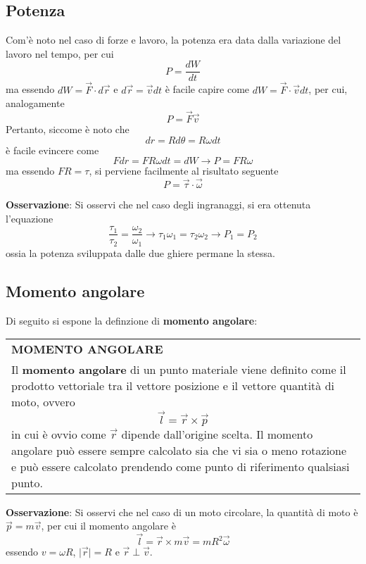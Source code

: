 \documentclass[a4paper]{extarticle}
\renewcommand\arraystretch{}
\begin{document}
\vspace{1em}
\subsection{Potenza}
Com'è noto nel caso di forze e lavoro, la potenza era data dalla variazione del lavoro nel tempo, per cui
\[\boxed{P=\frac{dW}{dt}}\]
ma essendo $dW=\vec F \cdot d \vec r$ e $d \vec r = \vec v dt$ è facile capire come $dW=\vec F \cdot \vec v dt$, per cui, analogamente
\[\boxed{P=\vec F \vec v}\]
Pertanto, siccome è noto che
\[dr = R d\theta = R \omega dt\]
è facile evincere come
\[F dr = F R \omega dt = dW \longrightarrow P=FR \omega\]
ma essendo $FR=\tau$, si perviene facilmente al risultato seguente
\[\boxed{P=\vec \tau \cdot \vec \omega}\]

\vspace{1em}
\noindent
\textbf{Osservazione}: Si osservi che nel caso degli ingranaggi, si era ottenuta l'equazione
\[\frac{\tau_1}{\tau_2} = \frac{\omega_2}{\omega_1} \longrightarrow \tau_1 \omega_1 = \tau_2 \omega_2 \longrightarrow P_1 = P_2\]
ossia la potenza sviluppata dalle due ghiere permane la stessa.

\vspace{1em}
\subsection{Momento angolare}
Di seguito si espone la definzione di \textbf{momento angolare}:

\vspace{1em}
\setlength{\tabcolsep}{14pt}
\renewcommand{\arraystretch}{2}
\noindent
\begin{tabularx}{\textwidth}{@{}|P|@{}}
    \hline
    {\textbf{MOMENTO ANGOLARE}}\\
    \parbox{\linewidth}{Il \textbf{momento angolare} di un punto materiale viene definito come il prodotto vettoriale tra il vettore posizione e il vettore quantità di moto, ovvero
    \[\boxed{\vec l = \vec r \times \vec p}\]
    in cui è ovvio come $\vec r$ dipende dall'origine scelta. Il momento angolare può essere sempre calcolato sia che vi sia o meno rotazione e può essere calcolato prendendo come punto di riferimento qualsiasi punto.
    \vspace{3mm}}\\
    \hline
\end{tabularx}

\vspace{1em}
\noindent
\textbf{Osservazione}: Si osservi che nel caso di un moto circolare, la quantità di moto è $\vec p = m \vec v$, per cui il momento angolare è
\[\vec l = \vec r \times m \vec v = mR^2 \vec \omega\]
essendo $v=\omega R$, $\vert \vec r \vert = R$ e $\vec r \perp \vec v$.
\end{document}
